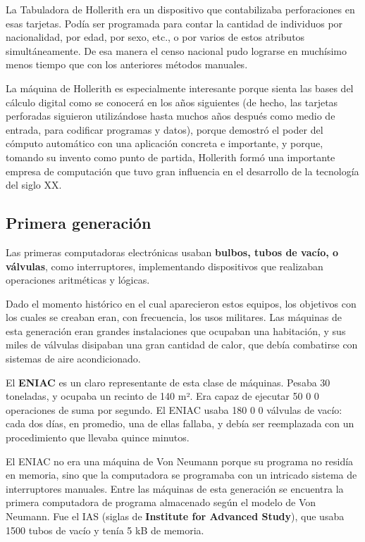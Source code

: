 \documentclass[spanish,A4,]{article}
\begin{document}
La Tabuladora de Hollerith era un dispositivo que contabilizaba
perforaciones en esas tarjetas. Podía ser programada para contar la
cantidad de individuos por nacionalidad, por edad, por sexo, etc., o por
varios de estos atributos simultáneamente. De esa manera el censo
nacional pudo lograrse en muchísimo menos tiempo que con los anteriores
métodos manuales.

La máquina de Hollerith es especialmente interesante porque sienta las
bases del cálculo digital como se conocerá en los años siguientes (de
hecho, las tarjetas perforadas siguieron utilizándose hasta muchos años
después como medio de entrada, para codificar programas y datos), porque
demostró el poder del cómputo automático con una aplicación concreta e
importante, y porque, tomando su invento como punto de partida,
Hollerith formó una importante empresa de computación que tuvo gran
influencia en el desarrollo de la tecnología del siglo XX.

\subsection{Primera generación}\label{primera-generaciuxf3n}

Las primeras computadoras electrónicas usaban \textbf{bulbos, tubos de
vacío, o válvulas}, como interruptores, implementando dispositivos que
realizaban operaciones aritméticas y lógicas.

Dado el momento histórico en el cual aparecieron estos equipos, los
objetivos con los cuales se creaban eran, con frecuencia, los usos
militares. Las máquinas de esta generación eran grandes instalaciones
que ocupaban una habitación, y sus miles de válvulas disipaban una gran
cantidad de calor, que debía combatirse con sistemas de aire
acondicionado.

El \textbf{ENIAC} es un claro representante de esta clase de máquinas.
Pesaba 30 toneladas, y ocupaba un recinto de 140 m². Era capaz de
ejecutar 50 0 0 operaciones de suma por segundo. El ENIAC usaba 180 0 0
válvulas de vacío: cada dos días, en promedio, una de ellas fallaba, y
debía ser reemplazada con un procedimiento que llevaba quince minutos.

El ENIAC no era una máquina de Von Neumann porque su programa no residía
en memoria, sino que la computadora se programaba con un intricado
sistema de interruptores manuales. Entre las máquinas de esta generación
se encuentra la primera computadora de programa almacenado según el
modelo de Von Neumann. Fue el IAS (siglas de \textbf{Institute for
Advanced Study}), que usaba 1500 tubos de vacío y tenía 5 kB de memoria.
\end{document}
